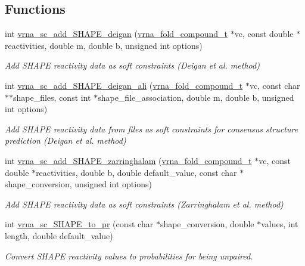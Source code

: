 \subsection*{Functions}
\begin{DoxyCompactItemize}
\item 
int \hyperlink{group__SHAPE__reactivities_ga57d612b58e1c61dd6cfcb5a843f8f1b3}{vrna\+\_\+sc\+\_\+add\+\_\+\+S\+H\+A\+P\+E\+\_\+deigan} (\hyperlink{group__fold__compound_ga1b0cef17fd40466cef5968eaeeff6166}{vrna\+\_\+fold\+\_\+compound\+\_\+t} $\ast$vc, const double $\ast$reactivities, double m, double b, unsigned int options)
\begin{DoxyCompactList}\small\item\em Add S\+H\+A\+PE reactivity data as soft constraints (Deigan et al. method) \end{DoxyCompactList}\item 
int \hyperlink{group__SHAPE__reactivities_ga04ba85da63d8c793bb8001d1e6f800ba}{vrna\+\_\+sc\+\_\+add\+\_\+\+S\+H\+A\+P\+E\+\_\+deigan\+\_\+ali} (\hyperlink{group__fold__compound_ga1b0cef17fd40466cef5968eaeeff6166}{vrna\+\_\+fold\+\_\+compound\+\_\+t} $\ast$vc, const char $\ast$$\ast$shape\+\_\+files, const int $\ast$shape\+\_\+file\+\_\+association, double m, double b, unsigned int options)
\begin{DoxyCompactList}\small\item\em Add S\+H\+A\+PE reactivity data from files as soft constraints for consensus structure prediction (Deigan et al. method) \end{DoxyCompactList}\item 
int \hyperlink{group__SHAPE__reactivities_gaf3c65a045060aef5c4e41693d30af58c}{vrna\+\_\+sc\+\_\+add\+\_\+\+S\+H\+A\+P\+E\+\_\+zarringhalam} (\hyperlink{group__fold__compound_ga1b0cef17fd40466cef5968eaeeff6166}{vrna\+\_\+fold\+\_\+compound\+\_\+t} $\ast$vc, const double $\ast$reactivities, double b, double default\+\_\+value, const char $\ast$shape\+\_\+conversion, unsigned int options)
\begin{DoxyCompactList}\small\item\em Add S\+H\+A\+PE reactivity data as soft constraints (Zarringhalam et al. method) \end{DoxyCompactList}\item 
int \hyperlink{group__SHAPE__reactivities_ga67675b3ed48744489a3bcfa4174197cb}{vrna\+\_\+sc\+\_\+\+S\+H\+A\+P\+E\+\_\+to\+\_\+pr} (const char $\ast$shape\+\_\+conversion, double $\ast$values, int length, double default\+\_\+value)
\begin{DoxyCompactList}\small\item\em Convert S\+H\+A\+PE reactivity values to probabilities for being unpaired. \end{DoxyCompactList}\end{DoxyCompactItemize}


